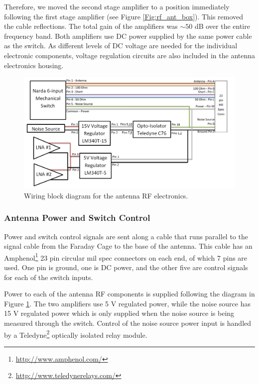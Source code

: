 Therefore, we moved the second stage amplifier to a position immediately following the first stage amplifier (see Figure \ref{Fig:rf_ant_box}). This removed the cable reflections. The total gain of the amplifiers was $\sim 50$ dB over the entire frequency band. Both amplifiers use DC power supplied by the same power cable as the switch. As different levels of DC voltage are needed for the individual electronic components, voltage regulation circuits are also included in the antenna electronics housing. 

\begin{figure}[htb]
\begin{center}
\includegraphics[width=0.9\linewidth]{SCIHI_system/figures/antenna_rf_power_block_diagram.png}
\caption{Wiring block diagram for the antenna RF electronics.}
\label{Fig:ant_RF_pow_block_diagram}
\end{center}
\end{figure}

\subsubsection{Antenna Power and Switch Control} \label{Sec:ant_pow}

Power and switch control signals are sent along a cable that runs parallel to the signal cable from the Faraday Cage to the base of the antenna. This cable has an Amphenol\footnote{\url{http://www.amphenol.com/}} 23 pin circular mil spec connectors on each end, of which 7 pins are used. One pin is ground, one is DC power, and the other five are control signals for each of the switch inputs. 

Power to each of the antenna RF components is supplied following the diagram in Figure \ref{Fig:ant_RF_pow_block_diagram}. The two amplifiers use 5 V regulated power, while the noise source has 15 V regulated power which is only supplied when the noise source is being measured through the switch. Control of the noise source power input is handled by a Teledyne\footnote{\url{http://www.teledynerelays.com/}} optically isolated relay module. 

